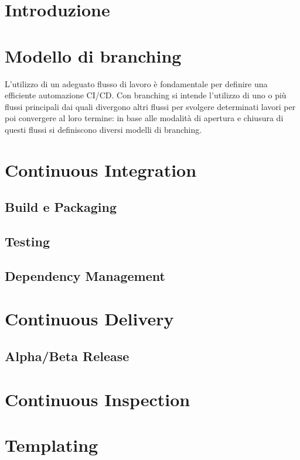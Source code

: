 
\section{Introduzione}


\section{Modello di branching}
L’utilizzo di un adeguato flusso di lavoro è fondamentale per definire una efficiente automazione CI/CD. Con branching si intende l’utilizzo di uno o più flussi principali dai quali divergono altri flussi per svolgere determinati lavori per poi convergere al loro termine: in base alle modalità di apertura e chiusura di questi flussi si definiscono diversi modelli di branching.

\section{Continuous Integration}
\subsection{Build e Packaging}

\subsection{Testing}

\subsection{Dependency Management}

\section{Continuous Delivery}

\subsection{Alpha/Beta Release}

\section{Continuous Inspection}

\section{Templating}
